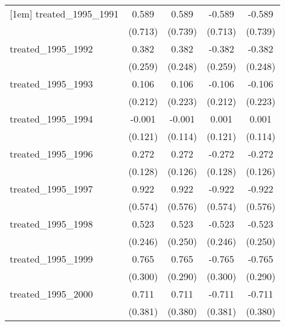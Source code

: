 {\begin{tabular}{l*{4}{c}}
[1em]
treated\_1995\_1991&       0.589         &       0.589         &      -0.589         &      -0.589         \\
            &     (0.713)         &     (0.739)         &     (0.713)         &     (0.739)         \\
[1em]
treated\_1995\_1992&       0.382         &       0.382         &      -0.382         &      -0.382         \\
            &     (0.259)         &     (0.248)         &     (0.259)         &     (0.248)         \\
[1em]
treated\_1995\_1993&       0.106         &       0.106         &      -0.106         &      -0.106         \\
            &     (0.212)         &     (0.223)         &     (0.212)         &     (0.223)         \\
[1em]
treated\_1995\_1994&      -0.001         &      -0.001         &       0.001         &       0.001         \\
            &     (0.121)         &     (0.114)         &     (0.121)         &     (0.114)         \\
[1em]
treated\_1995\_1996&       0.272\sym{*}  &       0.272\sym{*}  &      -0.272\sym{*}  &      -0.272\sym{*}  \\
            &     (0.128)         &     (0.126)         &     (0.128)         &     (0.126)         \\
[1em]
treated\_1995\_1997&       0.922         &       0.922         &      -0.922         &      -0.922         \\
            &     (0.574)         &     (0.576)         &     (0.574)         &     (0.576)         \\
[1em]
treated\_1995\_1998&       0.523\sym{*}  &       0.523\sym{*}  &      -0.523\sym{*}  &      -0.523\sym{*}  \\
            &     (0.246)         &     (0.250)         &     (0.246)         &     (0.250)         \\
[1em]
treated\_1995\_1999&       0.765\sym{*}  &       0.765\sym{**} &      -0.765\sym{*}  &      -0.765\sym{**} \\
            &     (0.300)         &     (0.290)         &     (0.300)         &     (0.290)         \\
[1em]
treated\_1995\_2000&       0.711         &       0.711         &      -0.711         &      -0.711         \\
            &     (0.381)         &     (0.380)         &     (0.381)         &     (0.380)         \\

\end{tabular}}
